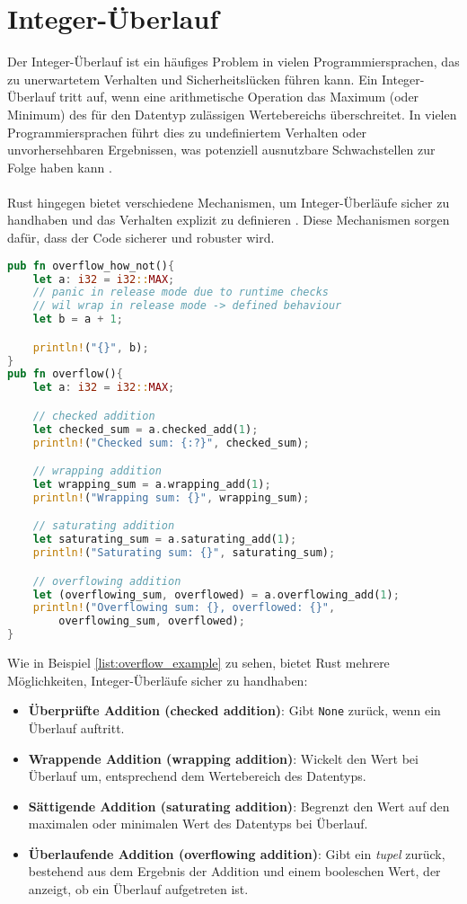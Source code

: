  \chapter{Integer-Überlauf}

Der Integer-Überlauf ist ein häufiges Problem in vielen Programmiersprachen, das zu unerwartetem Verhalten und Sicherheitslücken führen kann. 
Ein Integer-Überlauf tritt auf, wenn eine arithmetische Operation das Maximum (oder Minimum) des für den Datentyp zulässigen Wertebereichs überschreitet. 
In vielen Programmiersprachen führt dies zu undefiniertem Verhalten oder unvorhersehbaren Ergebnissen, was potenziell ausnutzbare Schwachstellen zur Folge haben kann \cite{cwe190}.\\
\\
Rust hingegen bietet verschiedene Mechanismen, um Integer-Überläufe sicher zu handhaben und das Verhalten explizit zu definieren \cite[Kapitel 3.2]{rust2023}. 
Diese Mechanismen sorgen dafür, dass der Code sicherer und robuster wird.

\begin{lstlisting}[language=Rust, caption= Integer-Überläufe, label=list:overflow_example]
pub fn overflow_how_not(){
    let a: i32 = i32::MAX;
    // panic in release mode due to runtime checks
    // wil wrap in release mode -> defined behaviour
    let b = a + 1;  

    println!("{}", b);
}
pub fn overflow(){
    let a: i32 = i32::MAX;

    // checked addition 
    let checked_sum = a.checked_add(1);
    println!("Checked sum: {:?}", checked_sum);  

    // wrapping addition 
    let wrapping_sum = a.wrapping_add(1);
    println!("Wrapping sum: {}", wrapping_sum);  

    // saturating addition 
    let saturating_sum = a.saturating_add(1);
    println!("Saturating sum: {}", saturating_sum);  

    // overflowing addition 
    let (overflowing_sum, overflowed) = a.overflowing_add(1);
    println!("Overflowing sum: {}, overflowed: {}",
        overflowing_sum, overflowed);  
}
\end{lstlisting}
\cleardoublepage
\noindent
Wie in Beispiel \ref{list:overflow_example} zu sehen, bietet Rust mehrere Möglichkeiten, Integer-Überläufe sicher zu handhaben:

\begin{itemize}
\item \textbf{Überprüfte Addition (checked addition)}: Gibt \texttt{None} zurück, wenn ein Überlauf auftritt.
\item \textbf{Wrappende Addition (wrapping addition)}: Wickelt den Wert bei Überlauf um, entsprechend dem Wertebereich des Datentyps.
\item \textbf{Sättigende Addition (saturating addition)}: Begrenzt den Wert auf den maximalen oder minimalen Wert des Datentyps bei Überlauf.
\item \textbf{Überlaufende Addition (overflowing addition)}: Gibt ein \textit{\gls{tupel}} zurück, bestehend aus dem Ergebnis der Addition und einem booleschen Wert, der anzeigt, ob ein Überlauf aufgetreten ist.
\end{itemize}
